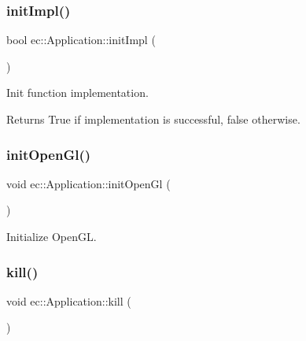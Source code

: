 \subsubsection{\texorpdfstring{init\+Impl()}{initImpl()}}
{\footnotesize\ttfamily bool ec\+::\+Application\+::init\+Impl (\begin{DoxyParamCaption}{ }\end{DoxyParamCaption})\hspace{0.3cm}{\ttfamily [virtual]}}



Init function implementation. 

\begin{DoxyReturn}{Returns}
True if implementation is successful, false otherwise. 
\end{DoxyReturn}
\mbox{\label{classec_1_1_application_a8d6ef43e247b541017fa82e001c42995}} 
\subsubsection{\texorpdfstring{init\+Open\+Gl()}{initOpenGl()}}
{\footnotesize\ttfamily void ec\+::\+Application\+::init\+Open\+Gl (\begin{DoxyParamCaption}{ }\end{DoxyParamCaption})\hspace{0.3cm}{\ttfamily [static]}}



Initialize Open\+GL. 

\mbox{\label{classec_1_1_application_a2a4c494f47bc187ddc2bb5411aa063a3}} 
\subsubsection{\texorpdfstring{kill()}{kill()}}
{\footnotesize\ttfamily void ec\+::\+Application\+::kill (\begin{DoxyParamCaption}{ }\end{DoxyParamCaption})\hspace{0.3cm}{\ttfamily [virtual]}}



